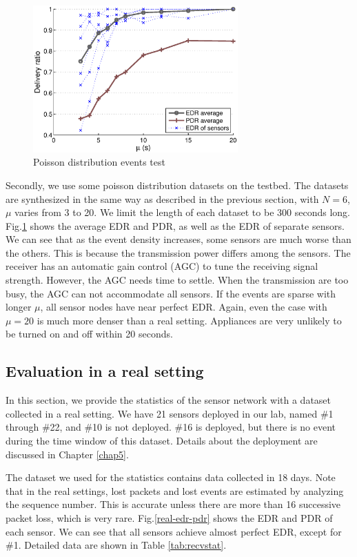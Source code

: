 \begin{figure}[htb]
  \centering
  \includegraphics[width=0.7\textwidth]{../../sw/pc/matlab/testbed-result/poisson-5min}
  \caption{Poisson distribution events test}
  \label{fig:poisson-5min}
\end{figure}

Secondly, we use some poisson distribution datasets on the testbed. The datasets are synthesized in the same way as described in the previous section, with $N = 6$, $\mu$ varies from 3 to 20. We limit the length of each dataset to be 300 seconds long. Fig.\ref{fig:poisson-5min} shows the average EDR and PDR, as well as the EDR of separate sensors. We can see that as the event density increases, some sensors are much worse than the others. This is because the transmission power differs among the sensors. The receiver has an automatic gain control (AGC) to tune the receiving signal strength. However, the AGC needs time to settle. When the transmission are too busy, the AGC can not accommodate all sensors. If the events are sparse with longer $\mu$, all sensor nodes have near perfect EDR. Again, even the case with $\mu=20$ is much more denser than a real setting. Appliances are very unlikely to be turned on and off within 20 seconds. 

\subsection{Evaluation in a real setting}

In this section, we provide the statistics of the sensor network with a dataset collected in a real setting. We have 21 sensors deployed in our lab, named \#1 through \#22, and \#10 is not deployed. \#16 is deployed, but there is no event during the time window of this dataset. Details about the deployment are discussed in Chapter \ref{chap5}.

The dataset we used for the statistics contains data collected in 18 days. Note that in the real settings, lost packets and lost events are estimated by analyzing the sequence number. This is accurate unless there are more than 16 successive packet loss, which is very rare. Fig.\ref{real-edr-pdr} shows the EDR and PDR of each sensor. We can see that  all sensors achieve almost perfect EDR, except for \#1. Detailed data are shown in Table \ref{tab:recvstat}.

